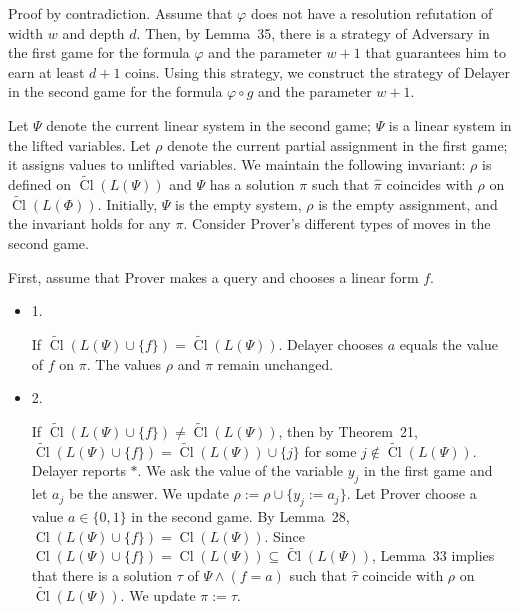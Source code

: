 \documentclass[10pt,a4paper]{article}
\begin{document}
Proof by contradiction. Assume that $\varphi$ does not have a resolution refutation of width $w$ and depth $d$. Then, by Lemma 35, there is a strategy of Adversary in the first game for the formula $\varphi$ and the parameter $w+1$ that guarantees him to earn at least $d+1$ coins.
Using this strategy, we construct the strategy of Delayer in the second game for the formula $\varphi\circ g$ and the parameter $w+1$.\par



Let $\Psi$ denote the current linear system in the second game; $\Psi$ is a linear system in the lifted variables.
Let $\rho$ denote the current partial assignment in the first game; it assigns values to unlifted variables. We maintain the following invariant: $\rho$ is defined on $\widetilde{\mathop{\mathrm{Cl}}}(L(\Psi))$ and $\Psi$ has a solution $\pi$ such that $\hat{\pi}$ coincides with $\rho$ on $\widetilde{\mathop{\mathrm{Cl}}}(L(\Phi))$. Initially, $\Psi$ is the empty system, $\rho$ is the empty assignment, and the invariant holds for any $\pi$. Consider Prover’s different types of moves in the second game.\par



First, assume that Prover makes a query and chooses a linear form $f$.\par



\begin{itemize}


\item 
1. 


If $\widetilde{\mathop{\mathrm{Cl}}}(L(\Psi)\cup\{f\})=\widetilde{\mathop{\mathrm{Cl}}}(L(\Psi))$. Delayer chooses $a$ equals the value of $f$ on $\pi$. The values $\rho$ and $\pi$ remain unchanged.\par





\item 
2. 


If $\widetilde{\mathop{\mathrm{Cl}}}(L(\Psi)\cup\{f\})\neq\widetilde{\mathop{\mathrm{Cl}}}(L(\Psi))$, then by Theorem 21, $\widetilde{\mathop{\mathrm{Cl}}}(L(\Psi)\cup\{f\})=\widetilde{\mathop{\mathrm{Cl}}}(L(\Psi))\cup\{j\}$ for some $j\notin\widetilde{\mathop{\mathrm{Cl}}}(L(\Psi))$. Delayer reports $*$.
We ask the value of the variable $y_{j}$ in the first game and let $a_{j}$ be the answer. We update $\rho:=\rho\cup\{y_{j}:=a_{j}\}$.
Let Prover choose a value $a\in\{0,1\}$ in the second game.
By Lemma 28, $\mathop{\mathrm{Cl}}(L(\Psi)\cup\{f\})=\mathop{\mathrm{Cl}}(L(\Psi))$. Since $\mathop{\mathrm{Cl}}(L(\Psi)\cup\{f\})=\mathop{\mathrm{Cl}}(L(\Psi))\subseteq\widetilde{\mathop{\mathrm{Cl}}}(L(\Psi))$, Lemma 33 implies that there is a solution $\tau$ of $\Psi\land(f=a)$ such that $\hat{\tau}$ coincide with $\rho$ on $\widetilde{\mathop{\mathrm{Cl}}}(L(\Psi))$. We update $\pi:=\tau$.\par





\end{itemize}
\end{document}
